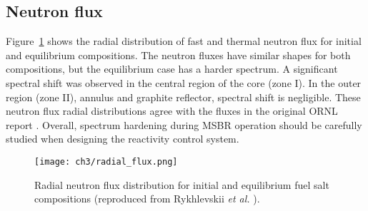 \subsection{Neutron flux}
Figure~\ref{fig:radial_flux} shows the radial distribution of fast and thermal 
neutron flux for initial and equilibrium compositions. The neutron fluxes have 
similar shapes for both compositions, but the equilibrium case has a harder 
spectrum. A significant spectral shift was observed in the central region of 
the core (zone I). In the outer region (zone II), annulus and graphite 
reflector, spectral shift is negligible. These neutron flux radial 
distributions agree with the fluxes in the original ORNL report 
\cite{robertson_conceptual_1971}. 
Overall, spectrum hardening during \gls{MSBR} operation should be carefully 
studied when designing the reactivity control system.
\begin{figure}[ht!] %
	\texttt{[image: ch3/radial\_flux.png]}
	\caption{Radial neutron flux distribution for initial and equilibrium fuel 
	salt compositions (reproduced from Rykhlevskii \emph{et al.} 
	\cite{rykhlevskii_modeling_2019}).}
	\label{fig:radial_flux}
\end{figure}

